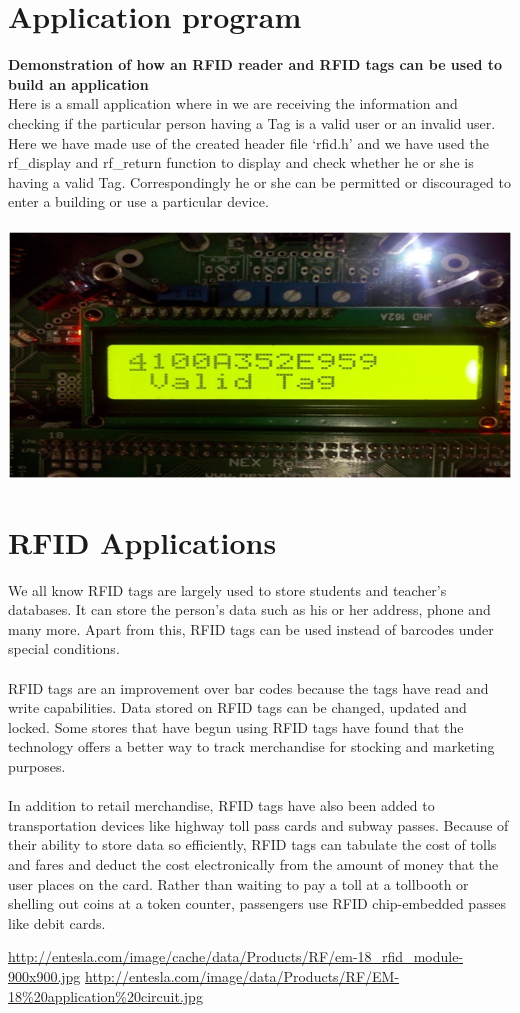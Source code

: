 \documentclass[a4paper,29.6pt]{article}
\begin{document}
\section{Application program}
\begin{small}
\textbf{Demonstration of how an RFID reader and RFID tags can be used to build an application}\\
Here is a small application where in we are receiving the information and checking if the particular person having a Tag is a valid user or an invalid user.\\
Here we have made use of the created header file ‘rfid.h’ and we have used the rf\_display and rf\_return function to display and check whether he or she is having a valid Tag. Correspondingly he or she can be permitted or discouraged to enter a building or use a particular device.\\\\
\includegraphics[scale=0.5]{lcd2}
\end{small}
\section{RFID Applications}
\begin{small}
We all know RFID tags are largely used to store students and teacher’s databases. It can store the person’s data such as his or her address, phone and many more. Apart from this, RFID tags can be used instead of barcodes under special conditions.\\\\

RFID tags are an improvement over bar codes because the tags have read and write capabilities. Data stored on RFID tags can be changed, updated and locked. Some stores that have begun using RFID tags have found that the technology offers a better way to track merchandise for stocking and marketing purposes.\\\\
In addition to retail merchandise, RFID tags have also been added to transportation devices like highway toll pass cards and subway passes. Because of their ability to store data so efficiently, RFID tags can tabulate the cost of tolls and fares and deduct the cost electronically from the amount of money that the user places on the card. Rather than waiting to pay a toll at a tollbooth or shelling out coins at a token counter, passengers use RFID chip-embedded passes like debit cards.

\end{small}

\begin{thebibliography}{99}
 \url{http://entesla.com/image/cache/data/Products/RF/em-18\_rfid\_module-900x900.jpg}
\url{http://entesla.com/image/data/Products/RF/EM-18\%20application%20circuit.jpg}

\end{thebibliography}
\end{document}
